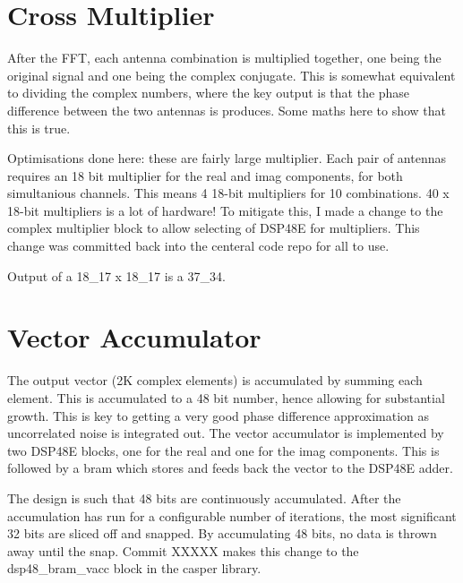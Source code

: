 \section{Cross Multiplier}
After the FFT, each antenna combination is multiplied together, one being the original signal and one being the complex conjugate. This is somewhat equivalent to dividing the complex numbers, where the key output is that the phase difference between the two antennas is produces. Some maths here to show that this is true. 

Optimisations done here: these are fairly large multiplier. Each pair of antennas requires an 18 bit multiplier for the real and imag components, for both simultanious channels. This means 4 18-bit multipliers for 10 combinations. 40 x 18-bit multipliers is a lot of hardware! 
To mitigate this, I made a change to the complex multiplier block to allow selecting of DSP48E for multipliers. This change was committed back into the centeral code repo for all to use.

Output of a 18\_17 x 18\_17 is a 37\_34. 

\section{Vector Accumulator}
The output vector (2K complex elements) is accumulated by summing each element. 
This is accumulated to a 48 bit number, hence allowing for substantial growth. 
This is key to getting a very good phase difference approximation as uncorrelated noise is integrated out. 
The vector accumulator is implemented by two DSP48E blocks, one for the real and one for the imag components. 
This is followed by a bram which stores and feeds back the vector to the DSP48E adder. 

The design is such that 48 bits are continuously accumulated. After the accumulation has run for a configurable number of iterations, the most significant 32 bits are sliced off and snapped. By accumulating 48 bits, no data is thrown away until the snap. Commit XXXXX makes this change to the dsp48\_bram\_vacc block in the casper library.

